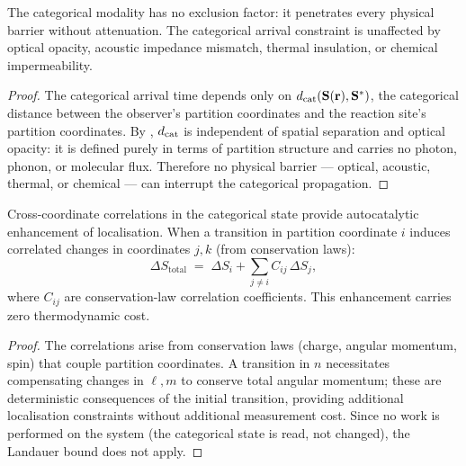 \begin{theorem}
\label{thm:cat-opacity-indep}
The categorical modality has no exclusion factor: it penetrates every physical
barrier without attenuation.  The categorical arrival constraint
 is unaffected by optical opacity, acoustic impedance mismatch,
thermal insulation, or chemical impermeability.
\end{theorem}

\begin{proof}
The categorical arrival time depends only on $d_{\mathrm{cat}}(\mathbf{S}(\mathbf{r}),
\mathbf{S}^*)$, the categorical distance between the observer's partition
coordinates and the reaction site's partition coordinates.  By
, $d_{\mathrm{cat}}$ is independent of spatial separation and optical
opacity: it is defined purely in terms of partition structure and carries no
photon, phonon, or molecular flux.  Therefore no physical barrier --- optical,
acoustic, thermal, or chemical --- can interrupt the categorical propagation.
\end{proof}

\begin{theorem}
\label{thm:autocatalytic-info}
Cross-coordinate correlations in the categorical state provide autocatalytic
enhancement of localisation.  When a transition in partition coordinate $i$
induces correlated changes in coordinates $j, k$ (from conservation laws):
\begin{equation}
    \Delta S_\mathrm{total}
    \;=\; \Delta S_i + \sum_{j \ne i} C_{ij}\,\Delta S_j,
\end{equation}
where $C_{ij}$ are conservation-law correlation coefficients.  This
enhancement carries zero thermodynamic cost.
\end{theorem}

\begin{proof}
The correlations arise from conservation laws (charge, angular momentum, spin)
that couple partition coordinates.  A transition in $n$ necessitates
compensating changes in $\ell, m$ to conserve total angular momentum; these
are deterministic consequences of the initial transition, providing additional
localisation constraints without additional measurement cost.  Since no work
is performed on the system (the categorical state is read, not changed), the
Landauer bound does not apply.
\end{proof}

